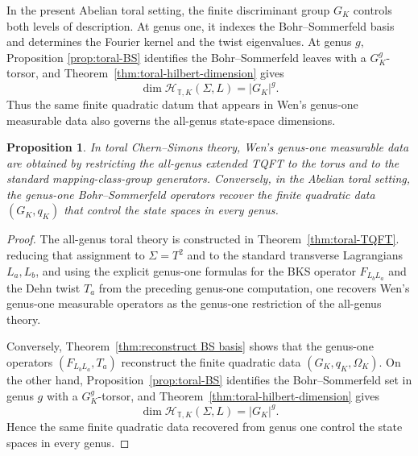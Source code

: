 \documentclass[12pt]{amsart}
\numberwithin{equation}{section}
\newtheorem{prop}[theorem]{Proposition}
\begin{document}
In the present Abelian toral setting, the finite discriminant group \(G_K\) controls both
levels of description. At genus one, it indexes the Bohr--Sommerfeld basis and determines
the Fourier kernel and the twist eigenvalues. At genus \(g\), Proposition \ref{prop:toral-BS}  identifies the
Bohr--Sommerfeld leaves with a \(G_K^g\)-torsor, and Theorem~\ref{thm:toral-hilbert-dimension} gives
\[
\dim \mathcal{H}_{\mathbb T,K}(\Sigma,L)=|G_K|^g.
\]
Thus the same finite quadratic datum that appears in Wen's genus-one measurable data
also governs the all-genus state-space dimensions. 

\begin{prop}
In toral Chern--Simons theory, Wen's genus-one measurable data are obtained by
restricting the all-genus extended TQFT to the torus and to the standard
mapping-class-group generators. Conversely, in the Abelian toral setting, the genus-one
Bohr--Sommerfeld operators recover the finite quadratic data \((G_K,q_K)\) that control
the state spaces in every genus.
\end{prop}

\begin{proof}
The all-genus toral theory is constructed in Theorem~\ref{thm:toral-TQFT}. reducing that assignment to
$\Sigma=T^2$ and to the standard transverse Lagrangians $L_a,L_b$, and using the explicit
genus-one formulas for the BKS operator $F_{L_bL_a}$ and the Dehn twist $T_a$ from the
preceding genus-one computation, one recovers Wen's genus-one measurable operators as
the genus-one restriction of the all-genus theory.

Conversely, Theorem~\ref{thm:reconstruct BS basis} shows that the genus-one operators $(F_{L_bL_a},T_a)$
reconstruct the finite quadratic data $(G_K,q_K,\Omega_K)$. On the other hand,
Proposition~\ref{prop:toral-BS} identifies the Bohr--Sommerfeld set in genus $g$ with a
$G_K^g$-torsor, and Theorem~\ref{thm:toral-hilbert-dimension} gives
\[
\dim \mathcal{H}_{\mathbb T,K}(\Sigma,L)=|G_K|^g.
\]
Hence the same finite quadratic data recovered from genus one control the state spaces in
every genus.
\end{proof}


\renewcommand{\refname}{References}

\end{document}
